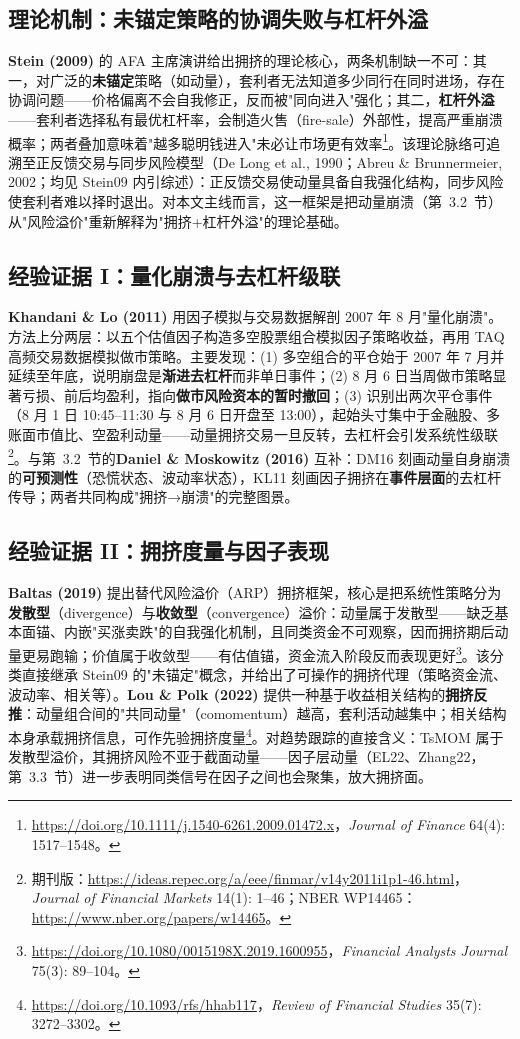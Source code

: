 \documentclass[11pt,a4paper]{article}
\begin{document}
\subsection{理论机制：未锚定策略的协调失败与杠杆外溢}
\textbf{Stein (2009)} 的 AFA 主席演讲给出拥挤的理论核心，两条机制缺一不可：其一，对广泛的\textbf{未锚定}策略（如动量），套利者无法知道多少同行在同时进场，存在协调问题——价格偏离不会自我修正，反而被"同向进入"强化；其二，\textbf{杠杆外溢}——套利者选择私有最优杠杆率，会制造火售（fire-sale）外部性，提高严重崩溃概率；两者叠加意味着"越多聪明钱进入"未必让市场更有效率\footnote{\url{https://doi.org/10.1111/j.1540-6261.2009.01472.x}，\emph{Journal of Finance} 64(4): 1517--1548。}。该理论脉络可追溯至正反馈交易与同步风险模型（De Long et al., 1990；Abreu \& Brunnermeier, 2002；均见 Stein09 内引综述）：正反馈交易使动量具备自我强化结构，同步风险使套利者难以择时退出。对本文主线而言，这一框架是把动量崩溃（第~3.2~节）从"风险溢价"重新解释为"拥挤+杠杆外溢"的理论基础。

\subsection{经验证据 I：量化崩溃与去杠杆级联}
\textbf{Khandani \& Lo (2011)} 用因子模拟与交易数据解剖 2007 年 8 月"量化崩溃"。方法上分两层：以五个估值因子构造多空股票组合模拟因子策略收益，再用 TAQ 高频交易数据模拟做市策略。主要发现：(1) 多空组合的平仓始于 2007 年 7 月并延续至年底，说明崩盘是\textbf{渐进去杠杆}而非单日事件；(2) 8 月 6 日当周做市策略显著亏损、前后均盈利，指向\textbf{做市风险资本的暂时撤回}；(3) 识别出两次平仓事件（8 月 1 日 10:45--11:30 与 8 月 6 日开盘至 13:00），起始头寸集中于金融股、多账面市值比、空盈利动量——动量拥挤交易一旦反转，去杠杆会引发系统性级联\footnote{期刊版：\url{https://ideas.repec.org/a/eee/finmar/v14y2011i1p1-46.html}，\emph{Journal of Financial Markets} 14(1): 1--46；NBER WP14465：\url{https://www.nber.org/papers/w14465}。}。与第~3.2~节的\textbf{Daniel \& Moskowitz (2016)} 互补：DM16 刻画动量自身崩溃的\textbf{可预测性}（恐慌状态、波动率状态），KL11 刻画因子拥挤在\textbf{事件层面}的去杠杆传导；两者共同构成"拥挤→崩溃"的完整图景。

\subsection{经验证据 II：拥挤度量与因子表现}
\textbf{Baltas (2019)} 提出替代风险溢价（ARP）拥挤框架，核心是把系统性策略分为\textbf{发散型}（divergence）与\textbf{收敛型}（convergence）溢价：动量属于发散型——缺乏基本面锚、内嵌"买涨卖跌"的自我强化机制，且同类资金不可观察，因而拥挤期后动量更易跑输；价值属于收敛型——有估值锚，资金流入阶段反而表现更好\footnote{\url{https://doi.org/10.1080/0015198X.2019.1600955}，\emph{Financial Analysts Journal} 75(3): 89--104。}。该分类直接继承 Stein09 的"未锚定"概念，并给出了可操作的拥挤代理（策略资金流、波动率、相关等）。\textbf{Lou \& Polk (2022)} 提供一种基于收益相关结构的\textbf{拥挤反推}：动量组合间的"共同动量"（comomentum）越高，套利活动越集中；相关结构本身承载拥挤信息，可作先验拥挤度量\footnote{\url{https://doi.org/10.1093/rfs/hhab117}，\emph{Review of Financial Studies} 35(7): 3272--3302。}。对趋势跟踪的直接含义：TsMOM 属于发散型溢价，其拥挤风险不亚于截面动量——因子层动量（EL22、Zhang22，第~3.3~节）进一步表明同类信号在因子之间也会聚集，放大拥挤面。
\end{document}
